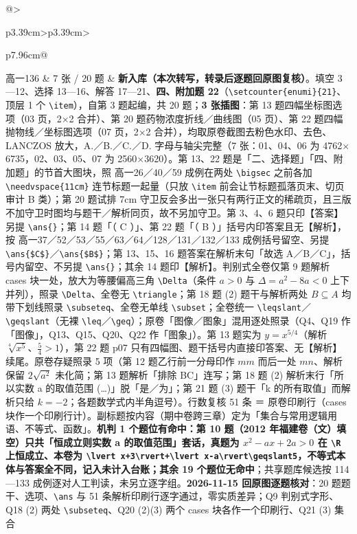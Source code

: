 \documentclass[a4paper,11pt]{article}
\begin{document}
\begin{xltabular}{\textwidth}{@{}>{\raggedright\arraybackslash}p{3.39cm}>{\centering\arraybackslash}p{3.39cm}>{\raggedright\arraybackslash}p{7.96cm}@{}}
高一136 & 7 张 / 20 题 & \textbf{新入库（本次转写，转录后逐题回原图复核）}。填空 3---12、选择 13---16、解答 17---21、\textbf{四、附加题 22}（\texttt{\textbackslash{}setcounter\{enumi\}\{21\}}、顶层 1 个 \texttt{\textbackslash{}item}），自第 3 题起编，共 20 题；\textbf{3 张插图}：第 13 题四幅坐标图选项（03 页，2$\times$2 合并）、第 20 题药物浓度折线／曲线图（05 页）、第 22 题四幅抛物线／坐标图选项（07 页，2$\times$2 合并），均取原卷截图去粉色水印、去色、LANCZOS 放大，A.／B.／C.／D. 字母与轴尖完整（7 张：01、04、06 为 4762$\times$6735，02、03、05、07 为 2560$\times$3620）。第 13、22 题是「二、选择题」「四、附加题」的节首大图块，照 高一26／40／59 成例在两处 \texttt{\textbackslash{}bigsec} 之前各加 \texttt{\textbackslash{}needvspace\{11cm\}} 连节标题一起量（只放 \texttt{\textbackslash{}item} 前会让节标题孤落页末、切页审计 B 类）；第 20 题试排 7cm 守卫反会多出一张只有两行正文的稀疏页，且三版不加守卫时图均与题干／解析同页，故不另加守卫。第 3、4、6 题只印【答案】另提 \texttt{\textbackslash{}ans\{\}}；第 14 题「（ C ）」、第 22 题「（ B ）」括号内印答案且无【解析】，按 高一37／52／53／55／63／64／128／131／132／133 成例括号留空、另提 \texttt{\textbackslash{}ans\{\$C\$\}}／\texttt{\textbackslash{}ans\{\$B\$\}}；第 13、15、16 题答案在解析末句「故选 A／B／C」，括号内留空、不另提 \texttt{\textbackslash{}ans\{\}}；其余 14 题印【解析】。判别式全卷仅第 9 题解析 cases 块一处，放大为等腰偏高三角 \texttt{\textbackslash{}Delta}（条件 \(a>0\) 与 \(\Delta=a^2-8a<0\) 上下并列），照录 \texttt{\textbackslash{}Delta}、全卷无 \texttt{\textbackslash{}triangle}；第 18 题 (2) 题干与解析两处 \(B\subseteq\allowbreak  A\) 均带下划线照录 \texttt{\textbackslash{}subseteq}、全卷无单线 \texttt{\textbackslash{}subset}；全卷统一 \texttt{\textbackslash{}leqslant}／\texttt{\textbackslash{}geqslant}（无裸 \texttt{\textbackslash{}leq}／\texttt{\textbackslash{}geq}）；原卷「图像／图象」混用逐处照录（Q4、Q19 作「图像」，Q13、Q15、Q20、Q22 作「图象」）。第 13 题实为 \(y=x^{5/4}\)（解析 \(\sqrt[4]{x^5}\)、\(\frac54>1\)），第 22 题 p07 只有四幅图、题干括号内直接印答案、无【解析】续尾。原卷存疑照录 5 项（第 12 题乙行前一分母印作 \(mm\) 而后一处 \(mn\)、解析保留 \(2\sqrt{a^2}\) 未化简；第 13 题解析「排除 BC」连写；第 18 题 (2) 解析末行「所以实数 a 的取值范围 (\ldots)」脱「是／为」；第 21 题 (3) 题干「k 的所有取值」而解析只给 \(k=\allowbreak -2\)；各题数学式内半角逗号）。行数复核 51 条 ＝ 原卷印刷行（cases 块作一个印刷行计）。副标题按内容（期中卷跨三章）定为「集合与常用逻辑用语、不等式、函数」。\textbf{机判 1 个题位有命中：第 10 题（2012 年福建卷（文）填空）只共「恒成立则实数 a 的取值范围」套话，真题为 \(x^2-ax+\allowbreak 2a>0\) 在 \texttt{\textbackslash{}R} 上恒成立、本卷为 \texttt{\textbackslash{}lvert\ x+3\textbackslash{}rvert+\textbackslash{}lvert\ x-\allowbreak{}a\textbackslash{}rvert\textbackslash{}geqslant5}，不等式本体与答案全不同，记入未计入台账；其余 19 个题位无命中}；共享题库候选按 114---133 成例逐对人工判读，未另立逐字组。\textbf{2026-11-15 回原图逐题核对}：20 题题干、选项、\texttt{\textbackslash{}ans} 与 51 条解析印刷行逐字通过，零实质差异；Q9 判别式字形、Q18 (2) 两处 \texttt{\textbackslash{}subseteq}、Q20 (2)(3) 两个 cases 块各作一个印刷行、Q21 (3) 集合 
\end{xltabular}
\end{document}
